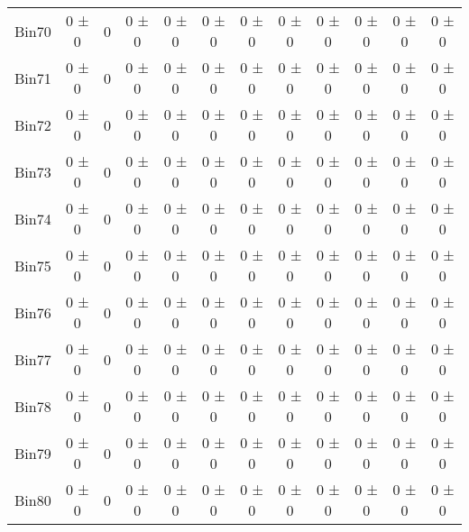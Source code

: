 \begin{tabular}{@{\extracolsep{4pt}}lccccccccccc@{}}
     Bin70 & 0 ± 0 & 0 & 0 ± 0 & 0 ± 0 & 0 ± 0 & 0 ± 0 & 0 ± 0 & 0 ± 0 & 0 ± 0 & 0 ± 0 & 0 ± 0 \\ 
     Bin71 & 0 ± 0 & 0 & 0 ± 0 & 0 ± 0 & 0 ± 0 & 0 ± 0 & 0 ± 0 & 0 ± 0 & 0 ± 0 & 0 ± 0 & 0 ± 0 \\ 
     Bin72 & 0 ± 0 & 0 & 0 ± 0 & 0 ± 0 & 0 ± 0 & 0 ± 0 & 0 ± 0 & 0 ± 0 & 0 ± 0 & 0 ± 0 & 0 ± 0 \\ 
     Bin73 & 0 ± 0 & 0 & 0 ± 0 & 0 ± 0 & 0 ± 0 & 0 ± 0 & 0 ± 0 & 0 ± 0 & 0 ± 0 & 0 ± 0 & 0 ± 0 \\ 
     Bin74 & 0 ± 0 & 0 & 0 ± 0 & 0 ± 0 & 0 ± 0 & 0 ± 0 & 0 ± 0 & 0 ± 0 & 0 ± 0 & 0 ± 0 & 0 ± 0 \\ 
     Bin75 & 0 ± 0 & 0 & 0 ± 0 & 0 ± 0 & 0 ± 0 & 0 ± 0 & 0 ± 0 & 0 ± 0 & 0 ± 0 & 0 ± 0 & 0 ± 0 \\ 
     Bin76 & 0 ± 0 & 0 & 0 ± 0 & 0 ± 0 & 0 ± 0 & 0 ± 0 & 0 ± 0 & 0 ± 0 & 0 ± 0 & 0 ± 0 & 0 ± 0 \\ 
     Bin77 & 0 ± 0 & 0 & 0 ± 0 & 0 ± 0 & 0 ± 0 & 0 ± 0 & 0 ± 0 & 0 ± 0 & 0 ± 0 & 0 ± 0 & 0 ± 0 \\ 
     Bin78 & 0 ± 0 & 0 & 0 ± 0 & 0 ± 0 & 0 ± 0 & 0 ± 0 & 0 ± 0 & 0 ± 0 & 0 ± 0 & 0 ± 0 & 0 ± 0 \\ 
     Bin79 & 0 ± 0 & 0 & 0 ± 0 & 0 ± 0 & 0 ± 0 & 0 ± 0 & 0 ± 0 & 0 ± 0 & 0 ± 0 & 0 ± 0 & 0 ± 0 \\ 
     Bin80 & 0 ± 0 & 0 & 0 ± 0 & 0 ± 0 & 0 ± 0 & 0 ± 0 & 0 ± 0 & 0 ± 0 & 0 ± 0 & 0 ± 0 & 0 ± 0 \\ 
\hline\hline
  \end{tabular}
